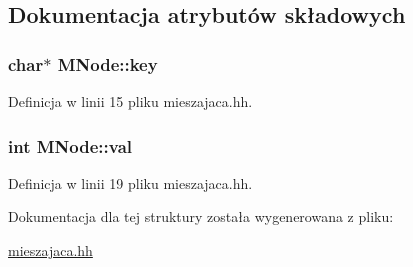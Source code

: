 \subsection{Dokumentacja atrybutów składowych}
\hypertarget{struct_m_node_a34eaceeae213bc93c9f18b752801a1f0}{
\subsubsection[{key}]{\setlength{\rightskip}{0pt plus 5cm}char$\ast$ M\-Node\-::key}}\label{struct_m_node_a34eaceeae213bc93c9f18b752801a1f0}


Definicja w linii 15 pliku mieszajaca.\-hh.

\hypertarget{struct_m_node_a9ba04f597c758c10b9f2309322fe4c8d}{
\subsubsection[{val}]{\setlength{\rightskip}{0pt plus 5cm}int M\-Node\-::val}}\label{struct_m_node_a9ba04f597c758c10b9f2309322fe4c8d}


Definicja w linii 19 pliku mieszajaca.\-hh.



Dokumentacja dla tej struktury została wygenerowana z pliku\-:\begin{DoxyCompactItemize}
\item 
\hyperlink{mieszajaca_8hh}{mieszajaca.\-hh}\end{DoxyCompactItemize}
